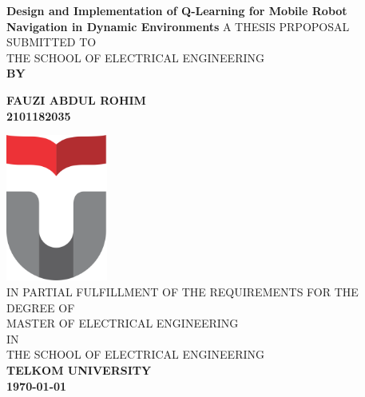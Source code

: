 \begin{titlepage}
\begin{center}
	\LARGE %
    {\sf\singlespacing 
		\textbf{ Design and Implementation of Q-Learning  for  Mobile Robot Navigation in Dynamic Environments}
	}
    \vfill
	\vfill
    \large
    { 
    	A THESIS PRPOPOSAL SUBMITTED TO\\[0.2cm]
    	THE SCHOOL OF ELECTRICAL ENGINEERING\\     
    }
	\vfill
    \sf\textbf{BY\\[0.5cm]}\par
    \large
    \textbf{FAUZI ABDUL ROHIM\\[0.5cm]2101182035}\par
    \vfill
    \includegraphics[width=0.25\textwidth]{logo/TelkomUniversity}\\[1.5cm] 
    \vfill 
    \normalfont\large
    { 
		IN PARTIAL FULFILLMENT OF THE REQUIREMENTS FOR THE DEGREE OF\\
        MASTER OF ELECTRICAL ENGINEERING\\
        IN\\
        THE SCHOOL OF ELECTRICAL ENGINEERING\\
    }    
    \vfill
    \Large
	\sf\textbf{TELKOM UNIVERSITY}\\
	\sf\textbf{\myyear \today}
\end{center}
\end{titlepage}

